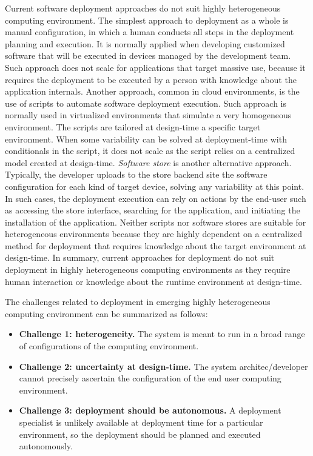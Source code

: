 Current software deployment approaches do not suit highly heterogeneous computing environment\cite{miorandi_internet_2012}.
The simplest approach to deployment as a whole is manual configuration, in which a human conducts all steps in the deployment planning and execution. It is normally applied when developing customized software that will be executed in devices managed by the development team. Such approach does not scale for applications that target massive use, because it requires the deployment to be executed by a person with knowledge about the application internals\cite{andersson_jesper_deployment_2000}.
Another approach, common in cloud environments, is the use of scripts to automate software deployment execution\cite{spinellis_dont_2012}. Such approach is normally used in virtualized environments that simulate a very homogeneous environment. The scripts are tailored at design-time a specific target environment. When some variability can be solved at deployment-time with conditionals in the script, it does not scale as the script relies on a centralized model created at design-time.
\emph{Software store} is another alternative approach. Typically, the developer uploads to the store backend site the software configuration for each kind of target device, solving any variability at this point.
In such cases, the deployment execution can rely on actions by the end-user such as accessing the store interface, searching for the application, and initiating the installation of the application.
Neither scripts nor software stores are suitable for heterogeneous environments because they are highly dependent on a centralized method for deployment that requires knowledge about the target environment at design-time. In summary, current approaches for deployment do not suit deployment in highly heterogeneous computing environments as they require human interaction or knowledge about the runtime environment at design-time.

The challenges related to deployment in emerging highly heterogeneous computing environment can be summarized as follows:

\begin{itemize}
  \item \textbf{ Challenge 1: heterogeneity.}  The system is meant to run in a broad range of configurations of the computing environment.

  \item \textbf{ Challenge 2: uncertainty at design-time.} The system architec/developer cannot precisely ascertain the configuration of the end user computing environment.

  \item \textbf{ Challenge 3: deployment should be autonomous.} A deployment specialist is unlikely available at deployment time for a particular environment, so the deployment should be planned and executed autonomously.
\end{itemize}

